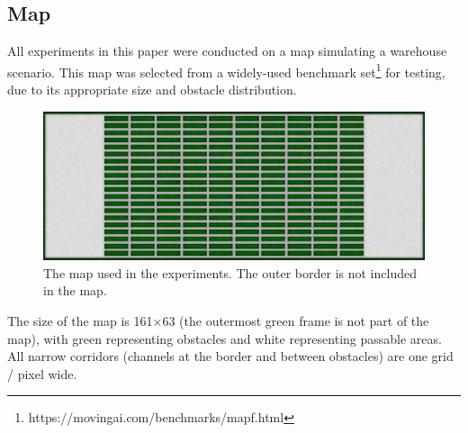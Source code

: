 \subsection*{Map}
\label{chap:map}

All experiments in this paper were conducted on a map simulating a warehouse scenario.
This map was selected from a widely-used benchmark set\cite{stern2019mapf}\footnote{https://movingai.com/benchmarks/mapf.html} for testing, due to its appropriate size and obstacle distribution.

\begin{figure}[htbp]
    \centering
    \includegraphics*[width = \linewidth]{figures/map(color).png}
    \caption{The map used in the experiments. The outer border is not included in the map.}
    \label{fig:Map}
\end{figure}

The size of the map is 161$\times$63 (the outermost green frame is not part of the map), 
with green representing obstacles and white representing passable areas.
All narrow corridors (channels at the border and between obstacles) are one grid / pixel wide.

